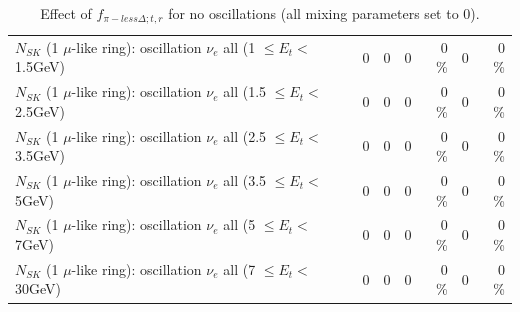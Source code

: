 \begin{table}
\begin{tabular}{| l | r | r | r  r | r  r |}
$N_{SK}$ (1 $\mu$-like ring): oscillation $\nu_{e}$ all (1 $\leq E_{t} <$ 1.5GeV) &               0 &               0 &               0 &        0 \%  &               0 &        0 \%  \\ 
$N_{SK}$ (1 $\mu$-like ring): oscillation $\nu_{e}$ all (1.5 $\leq E_{t} <$ 2.5GeV) &               0 &               0 &               0 &        0 \%  &               0 &        0 \%  \\ 
$N_{SK}$ (1 $\mu$-like ring): oscillation $\nu_{e}$ all (2.5 $\leq E_{t} <$ 3.5GeV) &               0 &               0 &               0 &        0 \%  &               0 &        0 \%  \\ 
$N_{SK}$ (1 $\mu$-like ring): oscillation $\nu_{e}$ all (3.5 $\leq E_{t} <$ 5GeV) &               0 &               0 &               0 &        0 \%  &               0 &        0 \%  \\ 
 $N_{SK}$ (1 $\mu$-like ring): oscillation $\nu_{e}$ all (5 $\leq E_{t} <$ 7GeV) &               0 &               0 &               0 &        0 \%  &               0 &        0 \%  \\ 
$N_{SK}$ (1 $\mu$-like ring): oscillation $\nu_{e}$ all (7 $\leq E_{t} <$ 30GeV) &               0 &               0 &               0 &        0 \%  &               0 &        0 \%  \\ 
\hline
\hline
\end{tabular}
\caption{ Effect of $f_{\pi-less\Delta; t, r}$ for no oscillations (all mixing parameters set to 0). }
\label{tab:num_xsec_pilessdelta_1RmuT_3f_osc_t13:0}
\end{table}
\clearpage
